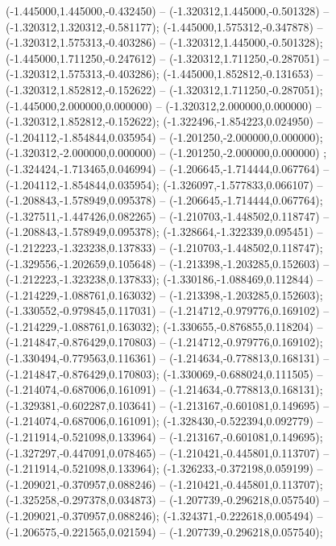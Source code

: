  (-1.445000,1.445000,-0.432450) -- (-1.320312,1.445000,-0.501328) -- (-1.320312,1.320312,-0.581177);
 (-1.445000,1.575312,-0.347878) -- (-1.320312,1.575313,-0.403286) -- (-1.320312,1.445000,-0.501328);
 (-1.445000,1.711250,-0.247612) -- (-1.320312,1.711250,-0.287051) -- (-1.320312,1.575313,-0.403286);
 (-1.445000,1.852812,-0.131653) -- (-1.320312,1.852812,-0.152622) -- (-1.320312,1.711250,-0.287051);
 (-1.445000,2.000000,0.000000) -- (-1.320312,2.000000,0.000000) -- (-1.320312,1.852812,-0.152622);
 (-1.322496,-1.854223,0.024950) -- (-1.204112,-1.854844,0.035954) -- (-1.201250,-2.000000,0.000000);
 (-1.320312,-2.000000,0.000000) -- (-1.201250,-2.000000,0.000000) ;
 (-1.324424,-1.713465,0.046994) -- (-1.206645,-1.714444,0.067764) -- (-1.204112,-1.854844,0.035954);
 (-1.326097,-1.577833,0.066107) -- (-1.208843,-1.578949,0.095378) -- (-1.206645,-1.714444,0.067764);
 (-1.327511,-1.447426,0.082265) -- (-1.210703,-1.448502,0.118747) -- (-1.208843,-1.578949,0.095378);
 (-1.328664,-1.322339,0.095451) -- (-1.212223,-1.323238,0.137833) -- (-1.210703,-1.448502,0.118747);
 (-1.329556,-1.202659,0.105648) -- (-1.213398,-1.203285,0.152603) -- (-1.212223,-1.323238,0.137833);
 (-1.330186,-1.088469,0.112844) -- (-1.214229,-1.088761,0.163032) -- (-1.213398,-1.203285,0.152603);
 (-1.330552,-0.979845,0.117031) -- (-1.214712,-0.979776,0.169102) -- (-1.214229,-1.088761,0.163032);
 (-1.330655,-0.876855,0.118204) -- (-1.214847,-0.876429,0.170803) -- (-1.214712,-0.979776,0.169102);
 (-1.330494,-0.779563,0.116361) -- (-1.214634,-0.778813,0.168131) -- (-1.214847,-0.876429,0.170803);
 (-1.330069,-0.688024,0.111505) -- (-1.214074,-0.687006,0.161091) -- (-1.214634,-0.778813,0.168131);
 (-1.329381,-0.602287,0.103641) -- (-1.213167,-0.601081,0.149695) -- (-1.214074,-0.687006,0.161091);
 (-1.328430,-0.522394,0.092779) -- (-1.211914,-0.521098,0.133964) -- (-1.213167,-0.601081,0.149695);
 (-1.327297,-0.447091,0.078465) -- (-1.210421,-0.445801,0.113707) -- (-1.211914,-0.521098,0.133964);
 (-1.326233,-0.372198,0.059199) -- (-1.209021,-0.370957,0.088246) -- (-1.210421,-0.445801,0.113707);
 (-1.325258,-0.297378,0.034873) -- (-1.207739,-0.296218,0.057540) -- (-1.209021,-0.370957,0.088246);
 (-1.324371,-0.222618,0.005494) -- (-1.206575,-0.221565,0.021594) -- (-1.207739,-0.296218,0.057540);
